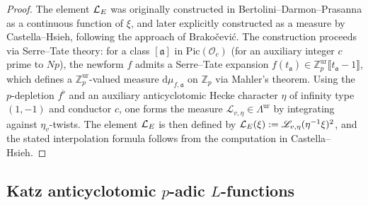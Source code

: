 \begin{proof}
  The element \(\mathcal{L}_E\) was originally constructed in Bertolini--Darmon--Prasanna as a continuous function of \(\xi\), and later explicitly constructed as a measure by Castella--Hsieh, following the approach of Brakočević. The construction proceeds via Serre--Tate theory: for a class \([\mathfrak{a}]\) in \(\mathrm{Pic}(\mathcal{O}_c)\) (for an auxiliary integer \(c\) prime to \(Np\)), the newform \(f\) admits a Serre--Tate expansion \(f(t_{\mathfrak{a}})\in\mathbb{Z}_p^{\mathrm{ur}}\llbracket t_{\mathfrak{a}}-1\rrbracket\), which defines a \(\mathbb{Z}_p^{\mathrm{ur}}\)-valued measure \(\mathrm{d}\mu_{f,\mathfrak{a}}\) on \(\mathbb{Z}_p\) via Mahler's theorem. Using the \(p\)-depletion \(f^\flat\) and an auxiliary anticyclotomic Hecke character \(\eta\) of infinity type \((1,-1)\) and conductor \(c\), one forms the measure \(\mathscr{L}_{v,\eta}\in\Lambda^{\mathrm{ur}}\) by integrating against \(\eta_v\)-twists. The element \(\mathcal{L}_E\) is then defined by \(\mathcal{L}_E(\xi) := \mathscr{L}_{v,\eta}(\eta^{-1}\xi)^2\), and the stated interpolation formula follows from the computation in Castella--Hsieh.
\end{proof}

\subsection{Katz anticyclotomic \texorpdfstring{\(p\)}{p}-adic \texorpdfstring{\(L\)}{L}-functions}

